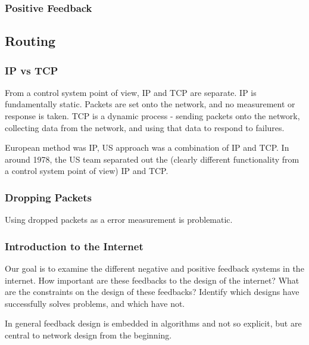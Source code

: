 
\subsubsection{Positive Feedback}


\subsection{Routing}

\subsubsection{IP vs TCP}

From a control system point of view, IP and TCP are separate. IP is fundamentally static. Packets
are set onto the network, and no measurement or response is taken. TCP is a dynamic process -
sending packets onto the network, collecting data from the network, and using that data to respond
to failures.

European method was IP, US approach was a combination of IP and TCP. In around 1978, the US team
separated out the (clearly different functionality from a control system point of view) IP and TCP.

\subsubsection{Dropping Packets}

Using dropped packets as a error measurement is problematic.

\subsubsection{Introduction to the Internet}

Our goal is to examine the different negative and positive feedback systems in the internet. How
important are these feedbacks to the design of the internet? What are the constraints on the design
of these feedbacks? Identify which designs have successfully solves problems, and which have not.

In general feedback design is embedded in algorithms and not so explicit, but are central to network
design from the beginning. 

